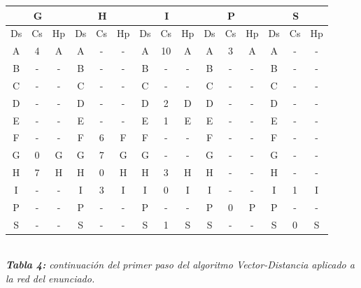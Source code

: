 \documentclass[letterpaper,10pt,onecolumn,titlepage]{article}
\begin{document}
  \begin{center}
   \begin{tabular}{|c|c|c|c|c|c|c|c|c|c|c|c|c|c|c|} \hline
     \multicolumn{3}{|c|}{G} & \multicolumn{3}{|c|}{H} &\multicolumn{3}{|c|}{I} & \multicolumn{3}{|c|}{P} & \multicolumn{3}{|c|}{S}    \\ \hline
     Ds & Cs & Hp & Ds & Cs & Hp & Ds & Cs & Hp & Ds & Cs & Hp & Ds & Cs & Hp  \\ \hline
     A  & 4  & A  & A  & -  & -  & A  & 10  & A  & A  & 3  & A  & A  & -  & -   \\ \hline
     B  & -  & -  & B  & -  & -  & B  & -  & -  & B  & -  & -  & B  & -  & -   \\ \hline
     C  & -  & -  & C  & -  & -  & C  & -  & -  & C  & -  & -  & C  & -  & -   \\ \hline
     D  & -  & -  & D  & -  & -  & D  & 2  & D  & D  & -  & -  & D  & -  & -   \\ \hline
     E  & -  & -  & E  & -  & -  & E  & 1  & E  & E  & -  & -  & E  & -  & -   \\ \hline
     F  & -  & -  & F  & 6  & F  & F  & -  & -  & F  & -  & -  & F  & -  & -   \\ \hline
     G  & 0  & G  & G  & 7  & G  & G  & -  & -  & G  & -  & -  & G  & -  & -   \\ \hline
     H  & 7  & H  & H  & 0  & H  & H  & 3  & H  & H  & -  & -  & H  & -  & -   \\ \hline
     I  & -  & -  & I  & 3  & I  & I  & 0  & I  & I  & -  & -  & I  & 1  & I   \\ \hline
     P  & -  & -  & P  & -  & -  & P  & -  & -  & P  & 0  & P  & P  & -  & -   \\ \hline
     S  & -  & -  & S  & -  & -  & S  & 1  & S  & S  & -  & -  & S  & 0  & S   \\ \hline
   \end{tabular}\\
   \textit{\textbf{Tabla 4:} continuación del primer paso del algoritmo Vector-Distancia aplicado a la red del enunciado.}
 \end{center}
 
\end{document}
